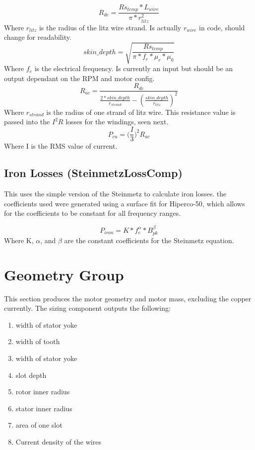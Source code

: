 \documentclass[10pt]{article}
\begin{document}
\begin{equation}
    R_{dc} = \frac{Rs_{temp}*L_{wire}}{\pi*r_{litz}^2}
\end{equation}
Where $r_{litz}$ is the radius of the litz wire strand. Is actually $r_{wire}$ in code, should change for readability.
\begin{equation}
    skin\_depth = \sqrt{ \frac{Rs_{temp}}{\pi*f_e*\mu_r*\mu_0}}
\end{equation}
Where $f_{e}$ is the electrical frequency. Is currently an input but should be an output dependant on the RPM and motor config.
\begin{equation}
    R_{ac} = \frac{R_{dc}}{\frac{2*skin\_depth}{r_{strand}} - (\frac{skin\_depth}{r_{litz}})^{2}}
\end{equation}
Where $r_{strand}$ is the radius of one strand of litz wire. This resistance value is passed into the $I^{2}R$ losses for the windings, seen next.
\begin{equation}
    P_{cu} = \Big(\frac{I}{3}\Big)^2  R_{ac}
\end{equation}
Where I is the RMS value of current.


\subsection{Iron Losses (SteinmetzLossComp)}
This uses the simple version of the Steinmetz to calculate iron losses. the coefficients used were generated using a surface fit for Hiperco-50, which allows for the coefficients to be constant for all frequency ranges.

\begin{equation}
    P_{iron} = K * f_e^{\alpha} * B_{pk}^{\beta}
\end{equation}
Where K, $\alpha$, and $\beta$ are the constant coefficients for the Steinmetz equation.

\section{Geometry Group}
This section produces the motor geometry and motor mass, excluding the copper currently. The sizing component outputs the following:
\begin{enumerate}
    \item width of stator yoke
    \item width of tooth
    \item width of stator yoke
    \item slot depth
    \item rotor inner radius
    \item stator inner radius
    \item area of one slot
    \item Current density of the wires
\end{enumerate}
\end{document}
